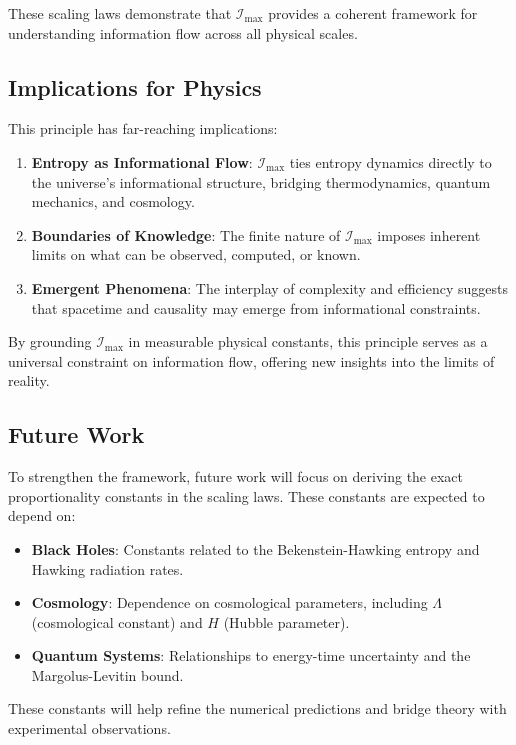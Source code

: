 \documentclass[12pt]{article}
\begin{document}
These scaling laws demonstrate that \( \mathcal{I}_{\text{max}} \) provides a coherent framework for understanding information flow across all physical scales.

\subsection{Implications for Physics}
This principle has far-reaching implications:
\begin{enumerate}
    \item \textbf{Entropy as Informational Flow}: \( \mathcal{I}_{\text{max}} \) ties entropy dynamics directly to the universe’s informational structure, bridging thermodynamics, quantum mechanics, and cosmology.
    \item \textbf{Boundaries of Knowledge}: The finite nature of \( \mathcal{I}_{\text{max}} \) imposes inherent limits on what can be observed, computed, or known.
    \item \textbf{Emergent Phenomena}: The interplay of complexity and efficiency suggests that spacetime and causality may emerge from informational constraints.
\end{enumerate}

By grounding \( \mathcal{I}_{\text{max}} \) in measurable physical constants, this principle serves as a universal constraint on information flow, offering new insights into the limits of reality.

\subsection{Future Work}
To strengthen the framework, future work will focus on deriving the exact proportionality constants in the scaling laws. These constants are expected to depend on:
\begin{itemize}
    \item \textbf{Black Holes}: Constants related to the Bekenstein-Hawking entropy and Hawking radiation rates.
    \item \textbf{Cosmology}: Dependence on cosmological parameters, including \( \Lambda \) (cosmological constant) and \( H \) (Hubble parameter).
    \item \textbf{Quantum Systems}: Relationships to energy-time uncertainty and the Margolus-Levitin bound.
\end{itemize}

These constants will help refine the numerical predictions and bridge theory with experimental observations.
\end{document}
